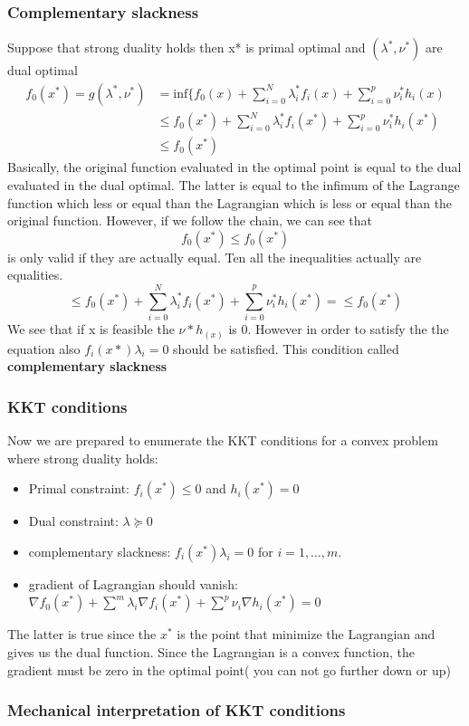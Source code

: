 \subsubsection{Complementary slackness}
Suppose that strong duality holds then x* is primal optimal and $(\lambda^*,\nu^*)$ are dual optimal
\begin{equation*}\begin{aligned}
f_0(x^*)=g(\lambda^*,\nu^*) &= \text{inf}\{ f_0(x) + \sum_{i=0}^N \lambda_i^*f_i(x) + \sum_{i=0}^p \nu_i^* h_i(x) \\
&\leq f_0(x^*) + \sum_{i=0}^N \lambda_i^*f_i(x^*) + \sum_{i=0}^p \nu_i^* h_i(x^*)\\
&\leq f_0(x^*)
\end{aligned}
\end{equation*}
Basically, the original function evaluated in the optimal point is equal to the dual evaluated in the dual optimal. The latter is equal to the infimum of the Lagrange function which less or equal than the Lagrangian which is less or equal than the original function. However, if we follow the chain, we can see that $$f_0(x^*)\leq f_0(x^*)$$ is only valid if they are actually equal. Ten all the inequalities actually are equalities. 
$$\leq f_0(x^*) + \sum_{i=0}^N \lambda_i^*f_i(x^*) + \sum_{i=0}^p \nu_i^* h_i(x^*) = \leq f_0(x^*)$$
We see that if x is feasible the $\nu*h_(x)$ is 0. However in order to satisfy the the equation also $f_i(x*)\lambda_i=0$ should be satisfied. This condition called \textbf{complementary slackness} 
\subsubsection{KKT conditions}
Now we are prepared to enumerate the KKT conditions for a convex problem where strong duality holds:
\begin{itemize}
\item Primal constraint: $f_i(x^*)\leq0$ and $h_i(x^*) = 0$
\item Dual constraint: $\lambda \succeq 0$
\item complementary slackness: $f_i(x^*)\lambda_i = 0$ for $i=1,\dots, m.$
\item gradient of Lagrangian should vanish: $\nabla f_0(x^*)+\sum^m\lambda_i\nabla f_i(x^*)+\sum^p\nu_i\nabla h_i(x^*) = 0$
\end{itemize}
The latter is true since the $x^*$ is the point that minimize the Lagrangian and gives us the dual function. Since the Lagrangian is a convex function, the gradient must be zero in the optimal point( you can not go further down or up)
\subsubsection{Mechanical interpretation of KKT conditions}
